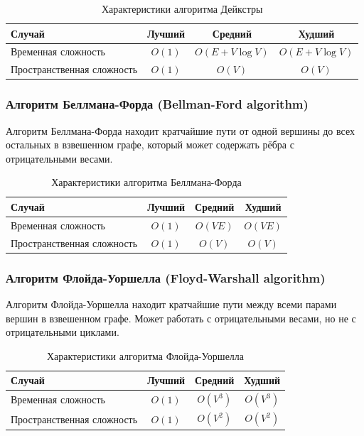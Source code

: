 \documentclass[a4paper,12pt]{article}
\begin{document}
\begin{table}[H]
    \centering
    \begin{tabular}{|l|c|c|c|}
        \hline
        Случай & Лучший & Средний & Худший \\
        \hline
        Временная сложность & $O(1)$ & $O(E + V \log V)$ & $O(E + V \log V)$ \\
        \hline
        Пространственная сложность & $O(1)$ & $O(V)$ & $O(V)$ \\
        \hline
    \end{tabular}
    \caption{Характеристики алгоритма Дейкстры}
\end{table}

\subsubsection{Алгоритм Беллмана-Форда (Bellman-Ford algorithm)}
\label{subsubsec:алгоритм-беллмана-форда-bellman-ford-algorithm}

Алгоритм Беллмана-Форда находит кратчайшие пути от одной вершины до всех остальных в взвешенном графе, который может содержать рёбра с отрицательными весами.

\begin{table}[H]
    \centering
    \begin{tabular}{|l|c|c|c|}
        \hline
        Случай & Лучший & Средний & Худший \\
        \hline
        Временная сложность & $O(1)$ & $O(VE)$ & $O(VE)$ \\
        \hline
        Пространственная сложность & $O(1)$ & $O(V)$ & $O(V)$ \\
        \hline
    \end{tabular}
    \caption{Характеристики алгоритма Беллмана-Форда}
\end{table}

\subsubsection{Алгоритм Флойда-Уоршелла (Floyd-Warshall algorithm)}
\label{subsubsec:алгоритм-флойда-уоршелла-floyd-warshall-algorithm}

Алгоритм Флойда-Уоршелла находит кратчайшие пути между всеми парами вершин в взвешенном графе. Может работать с отрицательными весами, но не с отрицательными циклами.

\begin{table}[H]
    \centering
    \begin{tabular}{|l|c|c|c|}
        \hline
        Случай & Лучший & Средний & Худший \\
        \hline
        Временная сложность & $O(1)$ & $O(V^3)$ & $O(V^3)$ \\
        \hline
        Пространственная сложность & $O(1)$ & $O(V^2)$ & $O(V^2)$ \\
        \hline
    \end{tabular}
    \caption{Характеристики алгоритма Флойда-Уоршелла}
\end{table}
\end{document}
